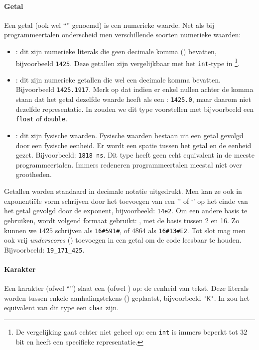 \paragraph{Getal}Een getal (ook wel ``'' genoemd) is een numerieke waarde. Net als bij programmeertalen onderscheid men verschillende soorten numerieke waarden:
\begin{itemize}
  \item {}: dit zijn numerieke literals die geen decimale komma () bevatten, bijvoorbeeld \verb+1425+. Deze getallen zijn vergelijkbaar met het \texttt{int}-type in \tjava{}\footnote{De vergelijking gaat echter niet geheel op: een \texttt{int} is immers beperkt tot $32$ bit en heeft een specifieke representatie.}.
  \item {}: dit zijn numerieke getallen die wel een decimale komma bevatten. Bijvoorbeeld \verb+1425.1917+. Merk op dat indien er enkel nullen achter de komma staan dat het getal dezelfde waarde heeft als een : \verb+1425.0+, maar daarom niet dezelfde representatie. In \tjava{} zouden we dit type voorstellen met bijvoorbeeld een \texttt{float} of \texttt{double}.
  \item {}: dit zijn fysische waarden. Fysische waarden bestaan uit een getal gevolgd door een fysische eenheid. Er wordt een spatie tussen het getal en de eenheid gezet. Bijvoorbeeld: \verb+1818 ns+. Dit type heeft geen echt equivalent in de meeste programmeertalen. Immers redeneren programmeertalen meestal niet over grootheden.
\end{itemize}
Getallen worden standaard in decimale notatie uitgedrukt. Men kan ze ook in exponenti\"ele vorm schrijven door het toevoegen van een '' of `' op het einde van het getal gevolgd door de exponent, bijvoorbeeld: \verb+14e2+. Om een andere basis te gebruiken, wordt volgend formaat gebruikt: , met de basis tussen 2 en 16. Zo kunnen we $1425$ schrijven als \verb+16#591#+, of $4864$ als \verb+16#13#E2+. Tot slot mag men ook vrij \emph{underscores} (\vhdltermen{\_}) toevoegen in een getal om de code leesbaar te houden. Bijvoorbeeld: \verb+19_171_425+.


\paragraph{Karakter} Een karakter (ofwel ``'') slaat een  (ofwel ) op: de eenheid van tekst. Deze literals worden tussen enkele aanhalingstekens () geplaatst, bijvoorbeeld \verb+'K'+. In \tjava{} zou het equivalent van dit type een \texttt{char} zijn.

